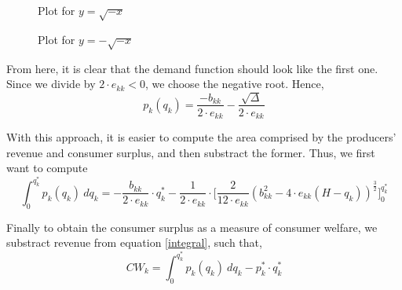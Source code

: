 \documentclass[12pt]{article}
\begin{document}
\begin{figure}[H]
    \begin{minipage}{0.45\textwidth}
\caption{Plot for $y = \sqrt{-x}$}
\end{minipage}\hfill
\begin{minipage}{0.45\textwidth}
\caption{Plot for $y = -\sqrt{-x}$}
    \end{minipage}
\end{figure}

From here, it is clear that the demand function should look like the first one. Since we divide by $2 \cdot e_{kk} <0$, we choose the negative root. Hence,
\begin{equation*}
p_k(q_k) = \frac{-b_{kk}}{2 \cdot e_{kk}} - \frac{\sqrt{\Delta}}{2 \cdot e_{kk}}
\end{equation*}

With this approach, it is easier to compute the area comprised by the producers' revenue and consumer surplus, and then substract the former. Thus, we first want to compute
\begin{equation} \label{integral}
\int_0^{q_k^*} p_k(q_k) \ dq_k = -\frac{b_{kk}}{2 \cdot e_{kk}} \cdot q_k^* -\frac{1}{2 \cdot e_{kk}} \cdot \bigg[\frac{2}{12 \cdot e_{kk}} (b_{kk}^2 - 4 \cdot e_{kk}(H - q_k))^{\frac{3}{2}}\bigg]_0^{q_k^*}
\end{equation}

Finally to obtain the consumer surplus as a measure of consumer welfare, we substract revenue from equation \ref{integral}, such that,
\begin{equation}
CW_k= \int_0^{q_k^*} p_k(q_k) \ dq_k  - p_k^* \cdot q_k^*
\end{equation}

%
\end{document}
